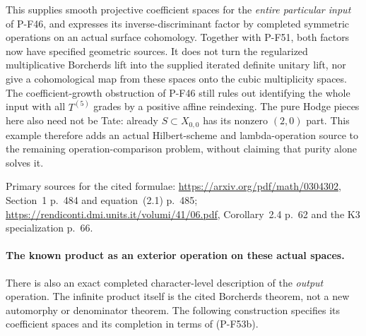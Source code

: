 This supplies smooth projective coefficient spaces
for the \emph{entire particular input} of P-F46,
and expresses its inverse-discriminant factor by
completed symmetric operations on an actual
surface cohomology. Together with P-F51, both
factors now have specified geometric sources.
It does not turn the regularized multiplicative
Borcherds lift into the supplied iterated definite
unitary lift, nor give a cohomological map from
these spaces onto the cubic multiplicity spaces.
The coefficient-growth obstruction of P-F46 still
rules out identifying the whole input with all
$T^{(5)}$ grades by a positive affine reindexing.
The pure Hodge pieces here also need not be Tate:
already $S\subset X_{0,0}$ has its nonzero
$(2,0)$ part. This example therefore adds an
actual Hilbert-scheme and lambda-operation source
to the remaining operation-comparison problem,
without claiming that purity alone solves it.

Primary sources for the cited formulae:
\url{https://arxiv.org/pdf/math/0304302},
Section~1 p.~484 and equation~(2.1) p.~485;
\url{https://rendiconti.dmi.units.it/volumi/41/06.pdf},
Corollary~2.4 p.~62 and the K3 specialization p.~66.

\paragraph{The known product as an exterior operation on these actual spaces.}
There is also an exact completed character-level description of the
\emph{output} operation. The infinite product itself is the cited
Borcherds theorem, not a new automorphy or denominator theorem.
The following construction specifies its coefficient spaces and its
completion in terms of (P-F53b).

